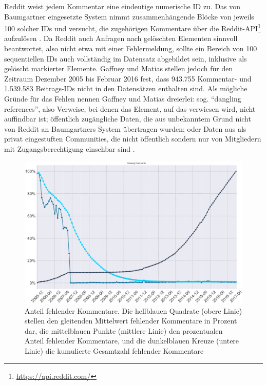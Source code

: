 \documentclass[11pt,a4paper,twoside]{article}
\let\rmarkdownfootnote\footnote%
\def\footnote{\protect\rmarkdownfootnote}
\begin{document}
Reddit weist jedem Kommentar eine eindeutige numerische ID zu. Das von
Baumgartner eingesetzte System nimmt zusammenhängende Blöcke von jeweils
100 solcher IDs und versucht, die zugehörigen Kommentare über die
Reddit-API\footnote{\url{https://api.reddit.com/}} aufzulösen
\autocite{Baumgartner2018a}. Da Reddit auch Anfragen nach gelöschten
Elementen sinnvoll beantwortet, also nicht etwa mit einer Fehlermeldung,
sollte ein Bereich von 100 sequentiellen IDs auch vollständig im
Datensatz abgebildet sein, inklusive als gelöscht markierter Elemente.
Gaffney und Matias stellen jedoch für den Zeitraum Dezember 2005 bis
Februar 2016 fest, dass 943.755 Kommentar- und 1.539.583 Beitrags-IDs
nicht in den Datensätzen enthalten sind. Als mögliche Gründe für das
Fehlen nennen Gaffney und Matias dreierlei: sog. \enquote{dangling
references}, also Verweise, bei denen das Element, auf das verwiesen
wird, nicht auffindbar ist; öffentlich zugängliche Daten, die aus
unbekanntem Grund nicht von Reddit an Baumgartners System übertragen
wurden; oder Daten aus als privat eingestuften Communities, die nicht
öffentlich sondern nur von Mitgliedern mit Zugangsberechtigung einsehbar
sind \autocite{Gaffney2018}.







\begin{figure}

{\centering \includegraphics[width=0.75\linewidth]{./images/gaffneymatias_fig4} 

}

\caption{Anteil fehlender Kommentare. Die hellblauen Quadrate (obere
Linie) stellen den gleitenden Mittelwert fehlender Kommentare in Prozent
dar, die mittelblauen Punkte (mittlere Linie) den prozentualen Anteil
fehlender Kommentare, und die dunkelblauen Kreuze (untere Linie) die
kumulierte Gesamtzahl fehlender Kommentare \autocite{Gaffney2018}}\label{fig:gf4}
\end{figure}
\end{document}
